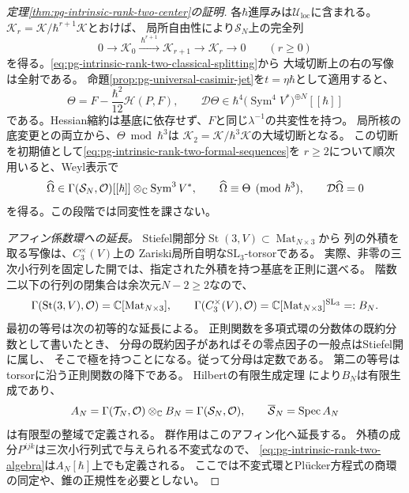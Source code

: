 \begin{proof}[定理\ref{thm:pg-intrinsic-rank-two-center}の証明]
各$\hbar$進厚みは$\mathcal U_{\mathrm{loc}}$に含まれる。
$\mathcal K_r=\mathcal K/\hbar^{r+1}\mathcal K$とおけば、
局所自由性により$\mathcal S_N$上の完全列
\begin{equation}
 0\longrightarrow\mathcal K_0
 \xrightarrow{\ \hbar^{r+1}\ }\mathcal K_{r+1}
 \longrightarrow\mathcal K_r\longrightarrow0
 \qquad(r\ge0)
 \label{eq:pg-intrinsic-rank-two-formal-sequences}
\end{equation}
を得る。\eqref{eq:pg-intrinsic-rank-two-classical-splitting}から
大域切断上の右の写像は全射である。
命題\ref{prop:pg-universal-casimir-jet}を$t=\eta\hbar$として適用すると、
\begin{equation}
 \Theta=F-\frac{\hbar^2}{12}\mathscr H(P,F),\qquad
 \mathcal D\Theta\in\hbar^4
       \bigl(\operatorname{Sym}^4V^*\bigr)^{\oplus N}[[\hbar]]
 \label{eq:pg-intrinsic-initial-second-jet}
\end{equation}
である。Hessian縮約は基底に依存せず、$F$と同じ$\lambda^{-1}$の共変性を持つ。
局所核の底変更との両立から、$\Theta\bmod\hbar^3$は
$\mathcal K_2=\mathcal K/\hbar^3\mathcal K$の大域切断となる。
この切断を初期値として\eqref{eq:pg-intrinsic-rank-two-formal-sequences}を
$r\ge2$について順次用いると、Weyl表示で
\begin{equation}
 \widehat\Omega\in
 \Gamma(\mathcal S_N,\mathcal O)[[\hbar]]
       \otimes_\mathbb C\operatorname{Sym}^3V^*,
 \qquad \widehat\Omega\equiv\Theta\pmod{\hbar^3},
 \qquad \mathcal D\widehat\Omega=0
 \label{eq:pg-intrinsic-rank-two-formal-center}
\end{equation}
を得る。この段階では同変性を課さない。

\emph{アフィン係数環への延長。}
Stiefel開部分$\operatorname{St}(3,V)\subset\operatorname{Mat}_{N\times3}$から
列の外積を取る写像は、$C_3^\times(V)$上の
Zariski局所自明な$\mathrm{SL}_3$-torsorである。
実際、非零の三次小行列を固定した開では、指定された外積を持つ基底を正則に選べる。
階数二以下の行列の閉集合は余次元$N-2\ge2$なので、
\begin{equation}
 \Gamma(\operatorname{St}(3,V),\mathcal O)
      =\mathbb C[\operatorname{Mat}_{N\times3}],\qquad
 \Gamma(C_3^\times(V),\mathcal O)
      =\mathbb C[\operatorname{Mat}_{N\times3}]^{\mathrm{SL}_3}=:B_N.
 \label{eq:pg-intrinsic-rank-two-stiefel-functions}
\end{equation}
最初の等号は次の初等的な延長による。
正則関数を多項式環の分数体の既約分数として書いたとき、
分母の既約因子があればその零点因子の一般点はStiefel開に属し、
そこで極を持つことになる。従って分母は定数である。
第二の等号はtorsorに沿う正則関数の降下である。
Hilbertの有限生成定理
\cite[Theorem~2.1, pp.~368--369]{PDerksenInvariants}により$B_N$は有限生成であり、
\begin{equation}
 A_N=\Gamma(\mathcal T_N,\mathcal O)\otimes_\mathbb C B_N
     =\Gamma(\mathcal S_N,\mathcal O),\qquad
 \overline{\mathcal S}_N=\operatorname{Spec}A_N
 \label{eq:pg-intrinsic-rank-two-affine-base}
\end{equation}
は有限型の整域で定義される。
群作用はこのアフィン化へ延長する。
外積の成分$P^{ijk}$は三次小行列式で与えられる不変式なので、
\eqref{eq:pg-intrinsic-rank-two-algebra}は$A_N[\hbar]$上でも定義される。
ここでは不変式環とPl\"ucker方程式の商環の同定や、錐の正規性を必要としない。


\end{proof}
